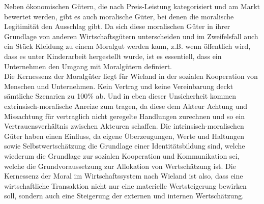 \documentclass[12pt]{article}
\begin{document}
Neben ökonomischen Gütern, die nach Preis-Leistung kategorisiert und am Markt bewertet werden, gibt es auch moralische Güter, bei denen die moralische Legitimität den Ausschlag gibt. Da sich diese moralischen Güter in ihrer Grundlage von anderen Wirtschaftsgütern unterscheiden und im Zweifelsfall auch ein Stück Kleidung zu einem Moralgut werden kann, z.B. wenn öffentlich wird, dass es unter Kinderarbeit hergestellt wurde, ist es essentiell, dass ein Unternehmen den Umgang mit Moralgütern definiert.\\
Die Kernessenz der Moralgüter liegt für Wieland in der sozialen Kooperation von Menschen und Unternehmen. Kein Vertrag und keine Vereinbarung deckt sämtliche Szenarien zu 100\% ab. Und in eben dieser Unsicherheit kommen extrinsisch-moralische Anreize zum tragen, da diese dem Akteur Achtung und Missachtung für vertraglich nicht geregelte Handlungen zurechnen und so ein Vertrauensverhältnis zwischen Akteuren schaffen. Die intrinsisch-moralischen Güter haben einen Einfluss, da eigene Überzeugungen, Werte und Haltungen sowie Selbstwertschätzung die Grundlage einer Identitätsbildung sind, welche wiederum die Grundlage zur sozialen Kooperation und Kommunikation sei, welche die Grundvoraussetzung zur Allokation von Wertschätzung ist. Die Kernessenz der Moral im Wirtschaftssystem nach Wieland ist also, dass eine wirtschaftliche Transaktion nicht nur eine materielle Wertsteigerung bewirken soll, sondern auch eine Steigerung der externen und internen Wertschätzung.
\end{document}
